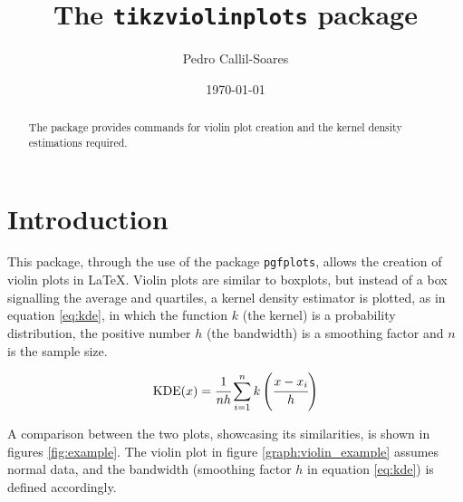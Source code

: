 \documentclass{article}
\title{The \texttt{tikzviolinplots} package}
\author{Pedro Callil-Soares}
\date{\today}
\begin{document}
\maketitle

\tableofcontents

\begin{abstract}
	The package provides commands for violin plot creation and
	the kernel density estimations required.
\end{abstract}

\section{Introduction}

This package, through the use of the package \texttt{pgfplots}, allows the
creation of violin plots in \LaTeX. Violin plots are similar to boxplots,
but instead of a box signalling the average and quartiles, a kernel density
estimator is plotted, as in equation \ref{eq:kde}, in which the function $k$
(the kernel) is a probability distribution, the positive number $h$ (the
bandwidth) is a smoothing factor and $n$ is the sample size.

\begin{equation}
	\label{eq:kde}
	\textnormal{KDE}(x) = %
	\cfrac{1}{nh}\sum_{i=1}^nk\left(\cfrac{x-x_i}{h}\right)
\end{equation}

A comparison between the two plots, showcasing its similarities, is
shown in figures \ref{fig:example}. The violin plot in figure
\ref{graph:violin_example} assumes normal data, and the bandwidth
(smoothing factor $h$ in equation \ref{eq:kde}) is defined accordingly.

\pgfplotsset{height=1.6\linewidth}
\end{document}

